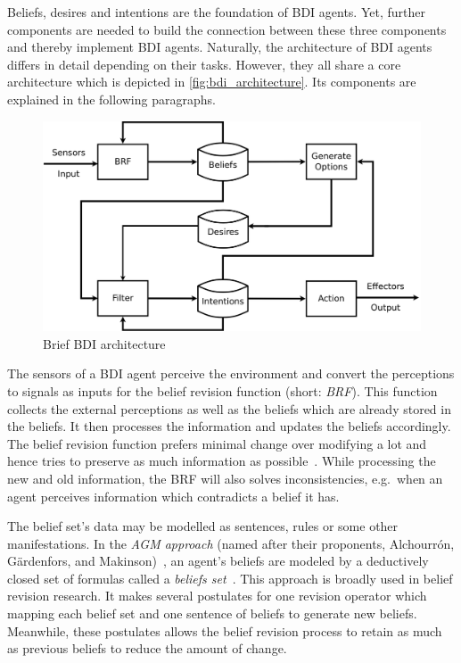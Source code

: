 Beliefs, desires and intentions are the foundation of BDI agents.
Yet, further components are needed to build the connection between these three components and thereby implement BDI agents.
Naturally, the architecture of BDI agents differs in detail depending on their tasks.
However, they all share a core architecture which is depicted in \autoref{fig:bdi_architecture}.
Its components are explained in the following paragraphs.
\begin{figure}[htbp]
  \centering
  \includegraphics[width=\textwidth]{images/BDIAr}
  \caption{Brief BDI architecture~\cite{BDIA}}
  \label{fig:bdi_architecture}
\end{figure}

The sensors of a BDI agent perceive the environment and convert the perceptions to signals as inputs for the belief revision function (short: \emph{BRF}).
This function collects the external perceptions as well as the beliefs which are already stored in the beliefs.
It then processes the information and updates the beliefs accordingly.
The belief revision function prefers minimal change over modifying a lot and hence tries to preserve as much information as possible~\cite{Antje_SpatialBelief_2011}.
While processing the new and old information, the BRF will also solves inconsistencies, e.g.\ when an agent perceives information which contradicts a belief it has.

The belief set's data may be modelled as sentences, rules or some other manifestations.
In the \emph{AGM approach} (named after their proponents, Alchourrón, Gärdenfors, and Makinson)~\cite{alchourron_revision_1985}, an agent's beliefs are modeled by a deductively closed set of formulas called a \emph{beliefs set}~\cite{James_revise_2011}. 
This approach is broadly used in belief revision research.
It makes several postulates for one revision operator which mapping each belief set and one sentence of beliefs to generate new beliefs.
Meanwhile, these postulates allows the belief revision process to retain as much as previous beliefs to reduce the amount of change.

